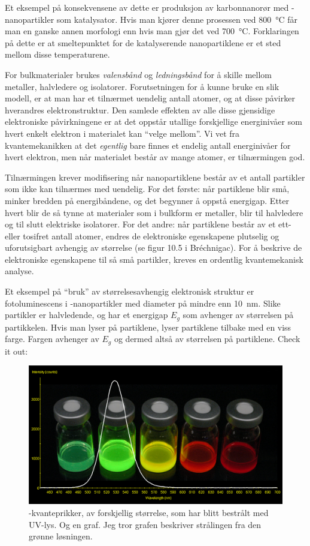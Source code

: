 Et eksempel på konsekvensene av dette er produksjon av karbonnanorør med -nanopartikler som katalysator. Hvis man kjører denne prosessen ved \SI{800}{\celsius} får man en ganske annen morfologi enn hvis man gjør det ved \SI{700}{\celsius}. Forklaringen på dette er at smeltepunktet for de katalyserende nanopartiklene er et sted mellom disse temperaturene.

For bulkmaterialer brukes \emph{valensbånd} og \emph{ledningsbånd} for å skille mellom metaller, halvledere og isolatorer. Forutsetningen for å kunne bruke en slik modell, er at man har et tilnærmet uendelig antall atomer, og at disse påvirker hverandres elektronstruktur. Den samlede effekten av alle disse gjensidige elektroniske påvirkningene er at det oppstår utallige forskjellige energinivåer som hvert enkelt elektron i materialet kan ``velge mellom''. Vi vet fra kvantemekanikken at det \emph{egentlig} bare finnes et endelig antall energinivåer for hvert elektron, men når materialet består av mange atomer, er tilnærmingen god. 

Tilnærmingen krever modifisering når nanopartiklene består av et antall partikler som ikke kan tilnærmes med uendelig. For det første: når partiklene blir små, minker bredden på energibåndene, og det begynner å oppstå energigap. Etter hvert blir de så tynne at materialer som i bulkform er metaller, blir til halvledere og til slutt elektriske isolatorer.  For det andre: når partiklene består av et ett- eller tosifret antall atomer, endres de elektroniske egenskapene plutselig og uforutsigbart avhengig av størrelse (se figur 10.5 i Bréchnigac). For å beskrive de elektroniske egenskapene til så små partikler, kreves en ordentlig kvantemekanisk analyse.

Et eksempel på ``bruk'' av størrelsesavhengig elektronisk struktur er fotoluminescens i -nanopartikler med diameter på mindre enn \SI{10}{\nano\meter}. Slike partikler er halvledende, og har et energigap $E_g$ som avhenger av størrelsen på partikkelen. Hvis man lyser på partiklene, lyser partiklene tilbake med en viss farge. Fargen avhenger av $E_g$ og dermed altså av størrelsen på partiklene. Check it out:
\begin{figure}[H]
	\centering
	\includegraphics[width=0.95\linewidth]{CdSeqdots.jpg}
	\caption{-kvanteprikker, av forskjellig størrelse, som har blitt bestrålt med UV-lys. Og en graf. Jeg tror grafen beskriver strålingen fra den grønne løsningen.}
	\label{fig:qdots}
\end{figure}

